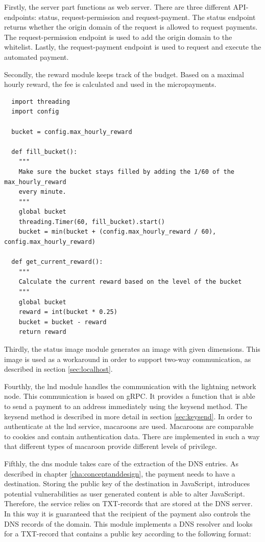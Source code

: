 Firstly, the server part functions as web server. There are three different API-endpoints: status, request-permission and request-payment. The status endpoint returns whether the origin domain of the request is allowed to request payments. The request-permission endpoint is used to add the origin domain to the whitelist. Lastly, the request-payment endpoint is used to request and execute the automated payment.

Secondly, the reward module keeps track of the budget. Based on a maximal hourly reward, the fee is calculated and used in the micropayments.


\lstset{language=Python}
\lstset{frame=lines}
\lstset{basicstyle=\footnotesize}
\begin{lstlisting}
  import threading
  import config
  
  bucket = config.max_hourly_reward
  
  def fill_bucket():
    """
    Make sure the bucket stays filled by adding the 1/60 of the max_hourly_reward
    every minute.
    """
    global bucket
    threading.Timer(60, fill_bucket).start()
    bucket = min(bucket + (config.max_hourly_reward / 60), config.max_hourly_reward)
  
  def get_current_reward():
    """
    Calculate the current reward based on the level of the bucket
    """
    global bucket
    reward = int(bucket * 0.25)
    bucket = bucket - reward
    return reward
\end{lstlisting}

Thirdly, the status image module generates an image with given dimensions. This image is used as a workaround in order to support two-way communication, as described in section \ref{sec:localhost}.

Fourthly, the lnd module handles the communication with the lightning network node. This communication is based on gRPC. It provides a function that is able to send a payment to an address immediately using the keysend method. The keysend method is described in more detail in section \ref{sec:keysend}. In order to authenticate at the lnd service, macaroons are used. Macaroons are comparable to cookies and contain authentication data. There are implemented in such a way that different types of macaroon provide different levels of privilege. 

Fifthly, the dns module takes care of the extraction of the DNS entries. As described in chapter \ref{cha:conceptanddesign}, the payment needs to have a destination. Storing the public key of the destination in JavaScript, introduces potential vulnerabilities as user generated content is able to alter JavaScript. Therefore, the service relies on TXT-records that are stored at the DNS server. In this way it is guaranteed that the recipient of the payment also controls the DNS records of the domain. This module implements a DNS resolver and looks for a TXT-record that contains a public key according to the following format:

